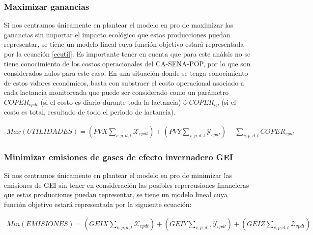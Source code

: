 \subsubsection{Maximizar ganancias}
Si nos centramos únicamente en plantear el modelo en pro de maximizar las ganancias sin importar el impacto ecológico que estas producciones puedan representar, se tiene un modelo lineal cuya función objetivo estará representada por la ecuación \ref{ecutil}. Es importante tener en cuenta que para este análsis no se tiene conocimiento de los costos operacionales del CA-SENA-POP, por lo que son considerados nulos para este caso.
En una situación donde se tenga conocimiento de estos valores económicos, basta con substraer el costo operacional asociado a cada lactancia monitoreada que puede ser considerado como un parámetro $COPER_{vpdt}$ (si el costo es diario durante toda la lactancia) ó $COPER_{vp}$ (si el costo es total, resultado de todo el periodo de lactancia).

\begin{equation}\label{ecutil}
\begin{split}
    Max(UTILIDADES) =\left(PVX\sum_{v,p,d,t}\mathcal{X}_{vpdt}\right) + \left(PVY\sum_{v,p,d,t}\mathcal{Y}_{vpdt} \right) - \sum_{v,p,d,t}COPER_{vpdt}
\end{split}
\end{equation}

\subsubsection{Minimizar emisiones de gases de efecto invernadero GEI}
Si nos centramos únicamente en plantear el modelo en pro de minimizar las emisiones de GEI sin tener en consideración las posibles repercusiones financieras que estas producciones puedan representar, se tiene un modelo lineal cuya función objetivo estará representada por la siguiente ecuación:

\begin{equation}\label{ecemis}
\begin{split}
    Min(EMISIONES) =\left( GEIX\sum_{v,p,d,t}\mathcal{X}_{vpdt}\right) + \left(GEIY\sum_{v,p,d,t}\mathcal{Y}_{vpdt}\right) + \left(GEIZ\sum_{v,p,d,t}\mathcal{Z}_{vpdt} \right)
\end{split}
\end{equation}

